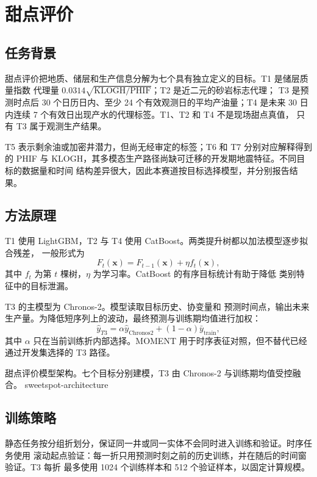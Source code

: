 \chapter{甜点评价}

\section{任务背景}

甜点评价把地质、储层和生产信息分解为七个具有独立定义的目标。T1 是储层质量指数
代理量 $0.0314\sqrt{\mathrm{KLOGH}/\mathrm{PHIF}}$；T2 是近二元的砂岩标志代理；
T3 是预测时点后 30 个日历日内、至少 24 个有效观测日的平均产油量；T4 是未来
30 日内连续 7 个有效日出现产水的代理标签。T1、T2 和 T4 不是现场甜点真值，
只有 T3 属于观测生产结果。

T5 表示剩余油或加密井潜力，但尚无经审定的标签；T6 和 T7 分别对应解释得到的 PHIF
与 KLOGH，其多模态生产路径尚缺可迁移的开发期地震特征。不同目标的数据量和时间
结构差异很大，因此本赛道按目标选择模型，并分别报告结果。

\section{方法原理}

T1 使用 LightGBM，T2 与 T4 使用 CatBoost。两类提升树都以加法模型逐步拟合残差，
一般形式为
\begin{equation}
  F_t(\bm{x})=F_{t-1}(\bm{x})+\eta f_t(\bm{x}),
\end{equation}
其中 $f_t$ 为第 $t$ 棵树，$\eta$ 为学习率。CatBoost 的有序目标统计有助于降低
类别特征中的目标泄漏。

T3 的主模型为 Chronos-2\cite{ansari2025chronos2}。模型读取目标历史、协变量和
预测时间点，输出未来生产量。为降低短序列上的波动，最终预测与训练期均值进行加权：
\begin{equation}
  \hat{y}_{T3}
  =\alpha\hat{y}_{\mathrm{Chronos2}}
  +(1-\alpha)\bar{y}_{\mathrm{train}},
\end{equation}
其中 $\alpha$ 只在当前训练折内部选择。MOMENT 用于时序表征对照，但不替代已经
通过开发集选择的 T3 路径。

  {甜点评价模型架构。七个目标分别建模，T3 由 Chronos-2 与训练期均值受控融合。}
  {sweetspot-architecture}

\section{训练策略}

静态任务按分组折划分，保证同一井或同一实体不会同时进入训练和验证。时序任务使用
滚动起点验证：每一折只用预测时刻之前的历史训练，并在随后的时间窗验证。T3 每折
最多使用 1024 个训练样本和 512 个验证样本，以固定计算规模。

